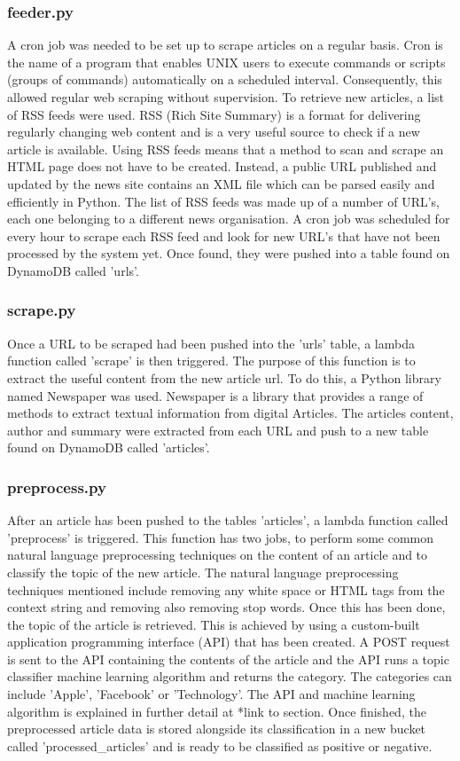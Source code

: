 \documentclass[a4paper,11pt]{report}
\begin{document}
\subsubsection{feeder.py}
A cron job was needed to be set up to scrape articles on a regular basis. Cron is the name of a program that enables UNIX users to execute commands or scripts (groups of commands) automatically on a scheduled interval. Consequently, this allowed regular web scraping without supervision. To retrieve new articles, a list of RSS feeds were used. RSS (Rich Site Summary) is a format for delivering regularly changing web content and is a very useful source to check if a new article is available. Using RSS feeds means that a method to scan and scrape an HTML page does not have to be created. Instead, a public URL published and updated by the news site contains an XML file which can be parsed easily and efficiently in Python. The list of RSS feeds was made up of a number of URL's, each one belonging to a different news organisation. A cron job was scheduled for every hour to scrape each RSS feed and look for new URL's that have not been processed by the system yet. Once found, they were pushed into a table found on DynamoDB called 'urls'.

\subsubsection{scrape.py}
Once a URL to be scraped had been pushed into the 'urls' table, a lambda function called 'scrape' is then triggered. The purpose of this function is to extract the useful content from the new article url. To do this, a Python library named Newspaper was used. Newspaper is a library that provides a range of methods to extract textual information from digital Articles. The articles content, author and summary were extracted from each URL and push to a new table found on DynamoDB called 'articles'.

\subsubsection{preprocess.py}
After an article has been pushed to the tables 'articles', a lambda function called 'preprocess' is triggered. This function has two jobs, to perform some common natural language preprocessing techniques on the content of an article and to classify the topic of the new article. The natural language preprocessing techniques mentioned include removing any white space or HTML tags from the context string and removing also removing stop words. Once this has been done, the topic of the article is retrieved. This is achieved by using a custom-built application programming interface (API) that has been created. A POST request is sent to the API containing the contents of the article and the API runs a topic classifier machine learning algorithm and returns the category. The categories can include 'Apple', 'Facebook' or 'Technology'. The API and machine learning algorithm is explained in further detail at *link to section. Once finished, the preprocessed article data is stored alongside its classification in a new bucket called 'processed\_articles' and is ready to be classified as positive or negative.
\end{document}
